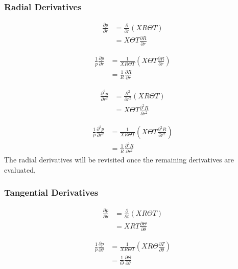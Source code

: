 \documentclass[a4paper]{report}
\begin{document}
\subsubsection{Radial Derivatives}
\begin{align*}
    \frac{\partial p}{\partial r} 
    &=
    \frac{\partial }{\partial r}  \left( XR\Theta T \right) \\
    &=
    X\Theta T\frac{\partial R}{\partial r}  
\end{align*}


\begin{align*}
    \frac{1}{p}\frac{\partial p}{\partial r} 
    &=
    \frac{ 1}{X R \Theta T}  \left( X\Theta T\frac{\partial R}{\partial r} \right) \\
    &=\frac{ 1}{ R}\frac{\partial R}{\partial r}  
\end{align*}

\begin{align*}
    \frac{\partial^2 p}{\partial r^2} 
    &=
    \frac{\partial^2 }{\partial r^2}  \left( XR\Theta T \right) \\
    &=
    X\Theta T\frac{\partial^2 R}{\partial r^2}  
\end{align*}


\begin{align*}
    \frac{1}{p}\frac{\partial^2 p}{\partial r^2} 
    &=
    \frac{ 1}{X R \Theta T}  \left( X\Theta T \frac{\partial^2 R}{\partial r^2} \right) \\
    &=\frac{ 1}{ R}\frac{\partial^2 R}{\partial r^2}  
\end{align*}
The radial derivatives will be revisited once the remaining derivatives are evaluated,

\subsubsection{Tangential Derivatives}

\begin{align*}
    \frac{\partial p}{\partial \theta } 
    &=
    \frac{\partial }{\partial t}  \left( XR\Theta T \right) \\
    &=
    XRT\frac{\partial \Theta}{\partial \theta}  
\end{align*}


\begin{align*}
    \frac{1}{p}\frac{\partial p}{\partial \theta} 
    &=
    \frac{ 1}{X R \Theta T}  \left( XR\Theta\frac{\partial T}{\partial \theta} \right) \\
    &=\frac{ 1}{ \Theta}\frac{\partial \Theta}{\partial \theta}  
\end{align*}
\end{document}
